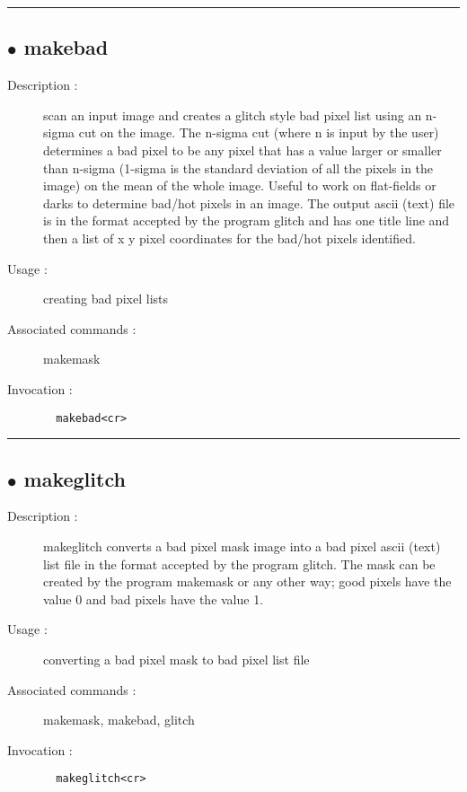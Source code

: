 \hrule \subsection*{$\bullet$ makebad}
\begin{description}
\item[Description :] scan an input image and creates a glitch style bad pixel list
using an n-sigma cut on the image.  The n-sigma cut (where n is input by
the user) determines a bad pixel to be any pixel that has a value larger
or smaller than n-sigma (1-sigma is the standard deviation of all the
pixels in the image) on the mean of the whole image.  Useful to work on
flat-fields or darks to determine bad/hot pixels in an image.  The output
ascii (text) file is in the format accepted by the program glitch and has
one title line and then a list of x y pixel coordinates for the bad/hot
pixels identified.
\item[Usage :] creating bad pixel lists
\item[Associated commands :] makemask
\item[Invocation :]

\verb+  makebad<cr> +\end{description}

\hrule \subsection*{$\bullet$ makeglitch}
\begin{description}
\item[Description :] makeglitch converts a bad pixel mask image into a bad pixel
ascii (text) list file in the format accepted by the program glitch.  The
mask can be created by the program makemask or any other way; good pixels
have the value 0 and bad pixels have the value 1.  
\item[Usage :] converting a bad pixel mask to bad pixel list file
\item[Associated commands :] makemask, makebad, glitch
\item[Invocation :]

\verb+  makeglitch<cr> +\end{description}


